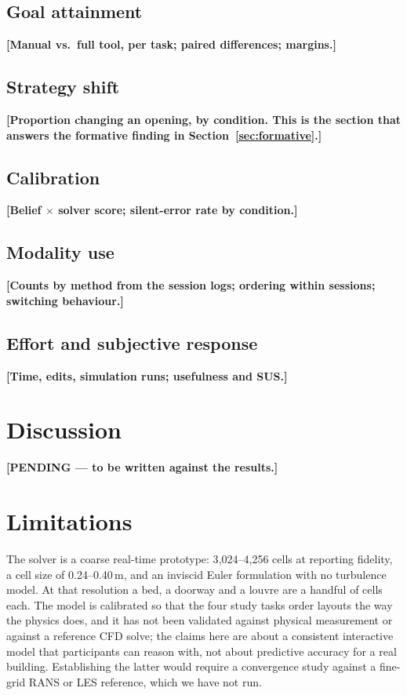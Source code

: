 \documentclass[manuscript,review,anonymous]{acmart}
\begin{document}
\subsection{Goal attainment}
\textbf{[Manual vs.\ full tool, per task; paired differences; margins.]}

\subsection{Strategy shift}
\textbf{[Proportion changing an opening, by condition. This is the section that
answers the formative finding in Section~\ref{sec:formative}.]}

\subsection{Calibration}
\textbf{[Belief $\times$ solver score; silent-error rate by condition.]}

\subsection{Modality use}
\textbf{[Counts by method from the session logs; ordering within sessions;
switching behaviour.]}

\subsection{Effort and subjective response}
\textbf{[Time, edits, simulation runs; usefulness and SUS.]}

\section{Discussion}

\textbf{[PENDING --- to be written against the results.]}

\section{Limitations}

The solver is a coarse real-time prototype: 3{,}024--4{,}256 cells at reporting
fidelity, a cell size of 0.24--0.40\,m, and an inviscid Euler formulation with
no turbulence model. At that resolution a bed, a doorway and a louvre are a
handful of cells each. The model is calibrated so that the four study tasks
order layouts the way the physics does, and it has not been validated against
physical measurement or against a reference CFD solve; the claims here are about
a consistent interactive model that participants can reason with, not about
predictive accuracy for a real building. Establishing the latter would require a
convergence study against a fine-grid RANS or LES reference, which we have not
run.
\end{document}
